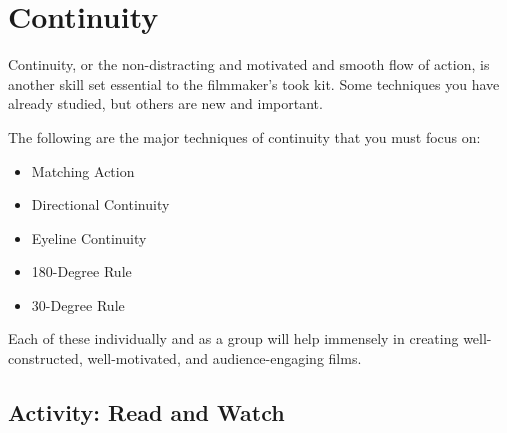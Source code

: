 \documentclass[
]{book}
\providecommand{\tightlist}{%
  \setlength{\itemsep}{0pt}\setlength{\parskip}{0pt}}
\begin{document}
\hypertarget{continuity}{%
\section{Continuity}\label{continuity}}

Continuity, or the non-distracting and motivated and smooth flow of action, is another skill set essential to the filmmaker's took kit. Some techniques you have already studied, but others are new and important.

The following are the major techniques of continuity that you must focus on:

\begin{itemize}
\tightlist
\item
  Matching Action\\
\item
  Directional Continuity\\
\item
  Eyeline Continuity\\
\item
  180-Degree Rule\\
\item
  30-Degree Rule
\end{itemize}

Each of these individually and as a group will help immensely in creating well-constructed, well-motivated, and audience-engaging films.

\hypertarget{activity-read-and-watch-2}{%
\subsection*{Activity: Read and Watch}\label{activity-read-and-watch-2}}
\end{document}
